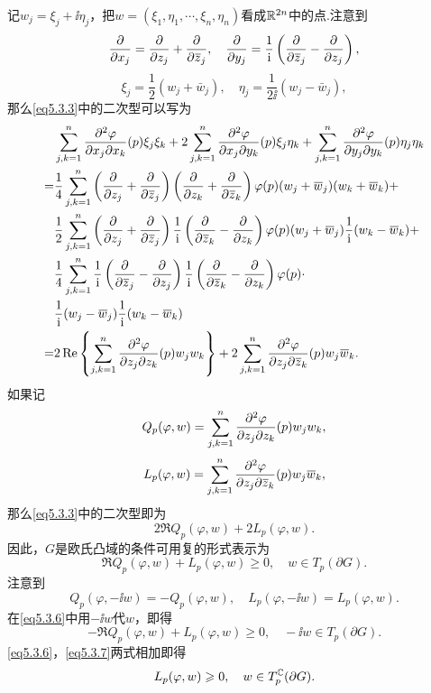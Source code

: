 记$w_j=\xi_j+\ii\eta_j$，把$w=(\xi_1,\eta_1,\cdots,\xi_n,\eta_n)$看成$\MR^{2n}$中的点.注意到
\[\pp{}{x_j}=\pp{}{z_j}+\pp{}{\bar{z}_j},\quad \pp{}{y_j}=\frac1{\ii}\left(\pp{}{\bar{z}_j}-\pp{}{z_j}\right),\]
\[\xi_j=\frac12(w_j+\bar{w}_j),\quad \eta_j=\frac1{2\ii}(w_j-\bar{w}_j),\]
那么\eqref{eq5.3.3}中的二次型可以写为
\begin{align*}
	&\sum_{j,k=1}^{n}\pppp{\varphi}{x_j}{x_k}(p)\xi_j\xi_k+2\sum_{j,k=1}^{n}\pppp{\varphi}{x_j}{y_k}(p)\xi_j\eta_k+\sum_{j,k=1}^{n}\pppp{\varphi}{y_j}{y_k}(p)\eta_j\eta_k\\
	=&\frac14\sum_{j,k=1}^{n}\left(\pp{}{z_j}+\pp{}{\bar{z}_j}\right)\left(\pp{}{z_k}+\pp{}{\bar{z}_k}\right)\varphi(p)(w_j+\bar{w}_j)(w_k+\bar{w}_k)+\\
	&\frac12\sum_{j,k=1}^{n}\left(\pp{}{z_j}+\pp{}{\bar{z}_j}\right)\frac1{\ii}\left(\pp{}{\bar{z}_k}-\pp{}{z_k}\right)\varphi(p)(w_j+\bar{w}_j)\frac1{\ii}(w_k-\bar{w}_k)+\\
	&\frac14\sum_{j,k=1}^{n}\frac1{\ii}\left(\pp{}{\bar{z}_j}-\pp{}{z_j}\right)\frac1{\ii}\left(\pp{}{\bar{z}_k}-\pp{}{z_k}\right)\varphi(p)\cdot\\
	&\frac1{\ii}(w_j-\bar{w}_j)\frac1{\ii}(w_k-\bar{w}_k)\\
	=&2\Re\left\{\sum_{j,k=1}^{n}\pppp{\varphi}{z_j}{z_k}(p)w_jw_k\right\}+2\sum_{j,k=1}^{n}\pppp{\varphi}{z_j}{\bar{z}_k}(p)w_j\bar{w}_k.
\end{align*}
如果记
\[Q_p(\varphi,w)=\sum_{j,k=1}^{n}\pppp{\varphi}{z_j}{z_k}(p)w_jw_k,\]
\begin{equation}\label{eq5.3.5}
	L_p(\varphi,w)=\sum_{j,k=1}^{n}\pppp{\varphi}{z_j}{\bar{z}_k}(p)w_j\bar{w}_k,
\end{equation}
那么\eqref{eq5.3.3}中的二次型即为
\[2\Re Q_p(\varphi,w)+2L_p(\varphi,w).\]
因此，$G$是欧氏凸域的条件可用复的形式表示为
\begin{equation}\label{eq5.3.6}
	\Re Q_p(\varphi,w)+L_p(\varphi,w)\ge0,\quad w\in T_p(\partial G).
\end{equation}
注意到
\[Q_p(\varphi,-\ii w)=-Q_p(\varphi,w),\quad L_p(\varphi,-\ii w)=L_p(\varphi,w).\]
在\eqref{eq5.3.6}中用$-\ii w$代$w$，即得
\begin{equation}\label{eq5.3.7}
	-\Re Q_p(\varphi,w)+L_p(\varphi,w)\ge0,\quad -\ii w\in T_p(\partial G).
\end{equation}
\eqref{eq5.3.6}，\eqref{eq5.3.7}两式相加即得
\begin{equation}\label{eq5.3.8}
	L_p(\varphi,w)\ge0,\quad w\in T_p^\MC(\partial G).
\end{equation}
